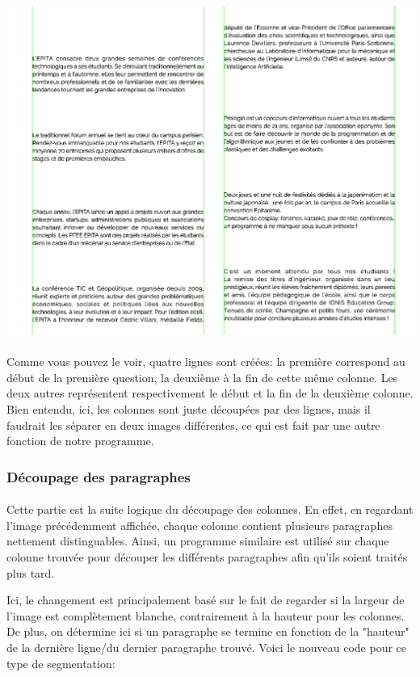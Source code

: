 \documentclass{article}
\begin{document}
	\begin{center}
		\includegraphics[scale=0.3]{columns}
	\end{center}
	
	\paragraph{}
	Comme vous pouvez le voir, quatre lignes sont créées: la première correspond au début de la première question, la deuxième à la fin de cette même colonne. Les deux autres représentent respectivement le début et la fin de la deuxième colonne. Bien entendu, ici, les colonnes sont juste découpées par des lignes, mais il faudrait les séparer en deux images différentes, ce qui est fait par une autre fonction de notre programme.
	
	\subsubsection{Découpage des paragraphes}
	\paragraph{}
	Cette partie est la suite logique du découpage des colonnes. En effet, en regardant l'image précédemment affichée, chaque colonne contient plusieurs paragraphes nettement distinguables. Ainsi, un programme similaire est utilisé sur chaque colonne trouvée pour découper les différents paragraphes afin qu'ils soient traités plus tard.
	\par
	Ici, le changement est principalement basé sur le fait de regarder si la largeur de l'image est complètement blanche, contrairement à la hauteur pour les colonnes. De plus, on détermine ici si un paragraphe se termine en fonction de la "hauteur" de la dernière ligne/du dernier paragraphe trouvé. Voici le nouveau code pour ce type de segmentation: \\
	
\end{document}

